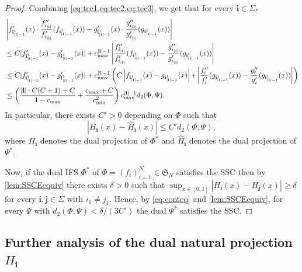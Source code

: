 \documentclass[11pt,a4paper]{article}
\def\cref#1{\ref{#1}}%
\theoremstyle{definition}
\theoremstyle{remark}
\newcommand{\0}{\mathbf{0}}
\newcommand{\bi}{\mathbf{i}}
\newcommand{\bj}{\mathbf{j}}
\numberwithin{equation}{section}
\begin{document}
\begin{proof}
  Combining \cref{eq:tec1,eq:tec2,eq:tec3}, we get that for every $\bi\in\Sigma_*$
  \begin{align*}
&\left|
f'_{\bi_{|\bi|-1}^1}(x) \cdot 
\frac{f''_{i_{|\bi|}}}{f'_{i_{|\bi|}}}(f_{\bi_{|\bi|-1}^1}(x))-
g'_{\bi_{|\bi|-1}^1}(x) \cdot 
\frac{g''_{i_{|\bi|}}}{g'_{i_{|\bi|}}}(g_{\bi_{|\bi|-1}^1}(x))\right|\\
&\leq C |f'_{\bi_{|\bi|-1}^1}(x)-g'_{\bi_{|\bi|-1}^1}(x)|+c_{\max}^{|\bi|-1}\left|
\frac{f''_{i_{|\bi|}}}{f'_{i_{|\bi|}}}(f_{\bi_{|\bi|-1}^1}(x))-
\frac{g''_{i_{|\bi|}}}{g'_{i_{|\bi|}}}(g_{\bi_{|\bi|-1}^1}(x))\right|\\
&\leq C |f'_{\bi_{|\bi|-1}^1}(x)-g'_{\bi_{|\bi|-1}^1}(x)|+c_{\max}^{|\bi|-1}\left(C\left|f_{\bi_{|\bi|-1}^1}(x)-
g_{\bi_{|\bi|-1}^1}(x)\right|\hspace{-1pt}+\hspace{-1pt}\left|\frac{f_{i}''}{f_i'}(g_{\bi_{|\bi|-1}^1}(x))-\frac{g_{i}''}{g_i'}(g_{\bi_{|\bi|-1}^1}(x))\right|\right)\\
&\leq\left(\frac{|\bi|\cdot C(C+1)+C}{1-c_{\max}}+\frac{c_{\max}+C}{c_{\min}^2}\right)c_{\max}^{|\bi|-1}d_2(\Phi,\Psi).
  \end{align*}
  In particular, there exists $C'>0$ depending on $\Phi$ such that
\begin{equation}\label{eq:conteq}
|H_{\bi}(x)-\hat{H}_{\bi}(x)|\leq C'd_2(\Phi,\Psi),
\end{equation}
where $H_{\bi}$ denotes the dual projection of $\Phi^*$ and $\hat{H}_{\bi}$ denotes the dual projection of $\Psi^*$.

Now, if the dual IFS $\Phi^*$ of $\Phi=(f_i)_{i=1}^N\in\mathfrak{S}_N$ satisfies the SSC then by
\cref{lem:SSCEequiv} there exists $\delta>0$ such that 
$\sup_{x\in[0,1]}|H_{\bi}(x)-H_{\bj}(x)|\geq\delta$ for every $\bi,\bj\in\Sigma$ with
$i_1\neq j_1$. Hence, by \cref{eq:conteq} and \cref{lem:SSCEequiv}, for every $\Psi$ with
$d_2(\Phi,\Psi)<\delta/(3C')$ the dual $\Psi^*$ satisfies the SSC.	
\end{proof}

\subsection{Further analysis of the dual natural projection \texorpdfstring{$H_{\bi}$}{H}}
\end{document}
